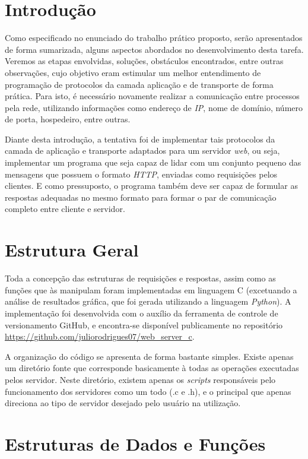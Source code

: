 \documentclass[a4paper, 12pt]{article}
\begin{document}
\tableofcontents
\newpage
\section{Introdução}

Como especificado no enunciado do trabalho prático proposto, serão apresentados de forma sumarizada, alguns aspectos abordados no desenvolvimento desta tarefa. Veremos as etapas envolvidas, soluções, obstáculos encontrados, entre outras observações, cujo objetivo eram estimular um melhor entendimento de programação de protocolos da camada aplicação e de transporte de forma prática. Para isto, é necessário novamente realizar a comunicação entre processos pela rede, utilizando informações como endereço de \emph{IP}, nome de domínio, número de porta, hospedeiro, entre outras.

Diante desta introdução, a tentativa foi de implementar tais protocolos da camada de aplicação e transporte adaptados para um servidor \emph{web}, ou seja, implementar um programa que seja capaz de lidar com um conjunto pequeno das mensagens que possuem o formato \emph{HTTP}, enviadas como requisições pelos clientes. E como pressuposto, o programa também deve ser capaz de formular as respostas adequadas no mesmo formato para formar o par de comunicação completo entre cliente e servidor. 

\section{Estrutura Geral}

Toda a concepção das estruturas de requisições e respostas, assim como as funções que às manipulam foram implementadas em linguagem C (excetuando a análise de resultados gráfica, que foi gerada utilizando a linguagem \emph{Python}). A implementação foi desenvolvida com o auxílio da ferramenta de controle de versionamento GitHub, e encontra-se disponível publicamente no repositório \url{https://github.com/juliorodrigues07/web_server_c}.

A organização do código se apresenta de forma bastante simples. Existe apenas um diretório fonte que corresponde basicamente à todas as operações executadas pelos servidor. Neste diretório, existem apenas os \emph{scripts} responsáveis pelo funcionamento dos servidores como um todo (.c e .h), e o principal que apenas direciona ao tipo de servidor desejado pelo usuário na utilização.

\pagebreak

\section{Estruturas de Dados e Funções}
\end{document}
